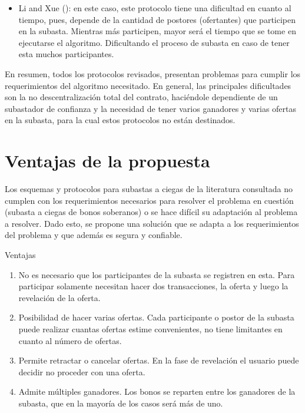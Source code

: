 \begin{itemize}
      \item Li and Xue (\citeyear{li2021}): en este caso, este protocolo tiene una dificultad en cuanto al
      tiempo, pues, depende de la cantidad de postores (ofertantes) que participen en la subasta. Mientras
      más participen, mayor será el tiempo que se tome en ejecutarse el algoritmo. Dificultando el proceso
      de subasta en caso de tener esta muchos participantes.

    \end{itemize}

    En resumen, todos los protocolos revisados, presentan problemas para cumplir los requerimientos del
    algoritmo necesitado. En general, las principales dificultades son la no descentralización total del 
    contrato, haciéndole dependiente de un subastador de confianza y la necesidad de tener varios 
    ganadores y varias ofertas en la subasta, para la cual estos protocolos no están destinados.

\section{Ventajas de la propuesta}
  Los esquemas y protocolos para subastas a ciegas de la literatura consultada no cumplen con los
   requerimientos necesarios
  para resolver el problema en cuestión (subasta a ciegas de bonos soberanos) o se hace difícil su 
  adaptación al problema a resolver.
  Dado esto, se propone una solución que se adapta a los requerimientos del problema y que además es 
  segura y confiable.

  Ventajas

  \begin{enumerate}
    \item No es necesario que los participantes de la subasta se registren en esta. Para participar solamente necesitan hacer dos 
    transacciones, la oferta y luego la revelación de la oferta.
    \item Posibilidad de hacer varias ofertas. Cada participante o postor de la subasta puede realizar cuantas ofertas estime convenientes,
    no tiene limitantes en cuanto al número de ofertas.
    \item Permite retractar o cancelar ofertas. En la fase de revelación el usuario puede decidir no proceder con una oferta.
    \item Admite múltiples ganadores. Los bonos se reparten entre los ganadores de la subasta, que en la mayoría de los casos será más 
    de uno. 
  \end{enumerate}

